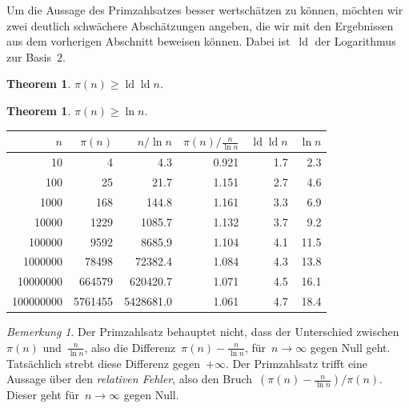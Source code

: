 \documentclass[twoside]{../zirkelblatt1415}
\theoremstyle{definition}
\theoremstyle{plain}
\newtheorem{thm}[defn]{Theorem}
\theoremstyle{remark}
\newtheorem{bem}[defn]{Bemerkung}
\DeclareMathOperator{\ld}{ld}
\begin{document}
Um die Aussage des Primzahlsatzes besser wertschätzen zu können, möchten wir
zwei deutlich schwächere Abschätzungen angeben, die wir mit den Ergebnissen aus
dem vorherigen Abschnitt beweisen können. Dabei ist~$\ld$ der Logarithmus zur
Basis~$2$.

\begin{thm}\label{thm:pi-schranke1}$\pi(n) \geq \ld \ld n$.\end{thm}
\begin{thm}\label{thm:pi-schranke2}$\pi(n) \geq \ln n$.\end{thm}

\begin{center}
  \begin{tabular}{rrrrrr}
    \toprule
    $n$ & $\pi(n)$ & $n/\ln n$ & $\pi(n)/\frac{n}{\ln n}$ & $\ld\ld n$ & $\ln n$ \\\midrule
    10    & 4    &   4.3     & 0.921     & 1.7 & 2.3 \\
    100   & 25    &  21.7      & 1.151   &    2.7 & 4.6 \\
    1000  & 168    & 144.8     & 1.161   &   3.3 & 6.9 \\
    10000 & 1229   & 1085.7    &  1.132 & 3.7 &  9.2 \\
    100000  &  9592 &    8685.9      & 1.104 & 4.1 &  11.5 \\
    1000000 &      78498 &  72382.4     &  1.084 & 4.3 &  13.8 \\
    10000000 &     664579 & 620420.7    &   1.071 & 4.5 &  16.1 \\
    100000000 &    5761455 & 5428681.0  &     1.061 & 4.7 & 18.4 \\
    \bottomrule
  \end{tabular}
\end{center}

\begin{bem}Der Primzahlsatz behauptet nicht, dass der Unterschied
zwischen~$\pi(n)$ und~$\frac{n}{\ln n}$, also die Differenz~$\pi(n) - \frac{n}{\ln n}$, für~$n
\to \infty$ gegen Null geht. Tatsächlich strebt diese Differenz
gegen~$+\infty$. Der Primzahlsatz trifft eine Aussage über den \emph{relativen
Fehler}, also den Bruch~$(\pi(n)-\frac{n}{\ln n})/\pi(n)$. Dieser geht für~$n \to
\infty$ gegen Null.
\end{bem}
\end{document}
